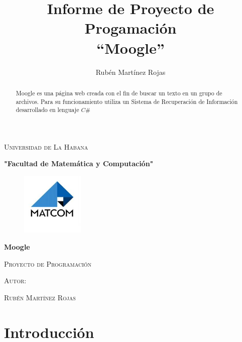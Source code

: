 \documentclass[12pt, a4paper]{article}
\title{Informe de Proyecto de Progamación\\ “Moogle”}
\author{Rubén Martínez Rojas}
\date{}
\begin{document}
\begin{titlepage}
      \centering
      {\scshape\LARGE Universidad de La Habana\par}
      \vspace{1cm}
      {\bfseries\large "Facultad de Matemática y Computación"\par}
      \vspace{1cm}
      \begin{figure}[h]
            \centering
            \includegraphics[width=3cm]{matcom.jpg}
      \end{figure}
      \vspace{1cm}
      {\bfseries\LARGE Moogle \par}
      \vspace{1cm}
      {\scshape\large Proyecto de Programación \par}
      \vspace{3cm}
      {\scshape\large Autor: \par}
      \vspace{0.5cm}
      {\scshape\large Rubén Martínez Rojas \par}
\end{titlepage}

\begin{abstract}
      Moogle es una página web creada con el fin de buscar
      un texto en un grupo de archivos. Para su funcionamiento
      utiliza un Sistema de Recuperación de Información
      desarrollado en lenguaje $C\#$
\end{abstract}

\section{Introducción}
\end{document}
